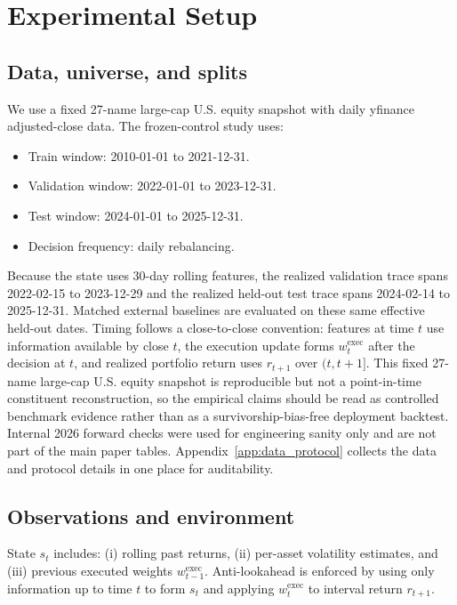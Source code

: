 \documentclass[10pt,twocolumn]{article}
\newcommand{\wexec}{w^{\mathrm{exec}}}
\begin{document}
\section{Experimental Setup}
\label{sec:exp}

\subsection{Data, universe, and splits}
We use a fixed 27-name large-cap U.S. equity snapshot with daily yfinance adjusted-close data. The frozen-control study uses:
\begin{itemize}[leftmargin=*,itemsep=1pt]
\item Train window: 2010-01-01 to 2021-12-31.
\item Validation window: 2022-01-01 to 2023-12-31.
\item Test window: 2024-01-01 to 2025-12-31.
\item Decision frequency: daily rebalancing.
\end{itemize}
Because the state uses 30-day rolling features, the realized validation trace spans 2022-02-15 to 2023-12-29 and the realized held-out test trace spans 2024-02-14 to 2025-12-31. Matched external baselines are evaluated on these same effective held-out dates.
Timing follows a close-to-close convention: features at time $t$ use information available by close $t$, the execution update forms $\wexec_t$ after the decision at $t$, and realized portfolio return uses $r_{t+1}$ over $(t,t+1]$. This fixed 27-name large-cap U.S. equity snapshot is reproducible but not a point-in-time constituent reconstruction, so the empirical claims should be read as controlled benchmark evidence rather than as a survivorship-bias-free deployment backtest. Internal 2026 forward checks were used for engineering sanity only and are not part of the main paper tables. Appendix~\ref{app:data_protocol} collects the data and protocol details in one place for auditability.

\subsection{Observations and environment}
State $s_t$ includes: (i) rolling past returns, (ii) per-asset volatility estimates, and (iii) previous executed weights $\wexec_{t-1}$. Anti-lookahead is enforced by using only information up to time $t$ to form $s_t$ and applying $\wexec_t$ to interval return $r_{t+1}$.
\end{document}
